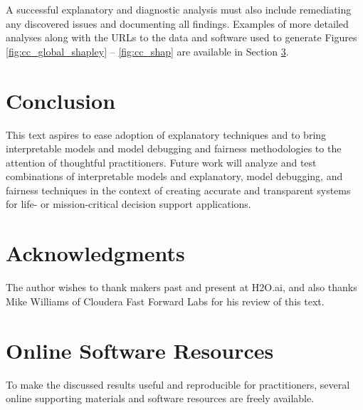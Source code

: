 \documentclass[sigconf, review]{acmart}
\begin{document}
\noindent A successful explanatory and diagnostic analysis must also include remediating any discovered issues and documenting all findings. Examples of more detailed analyses along with the URLs to the data and software used to generate Figures \ref{fig:cc_global_shapley} -- \ref{fig:cc_shap} are available in Section \ref{sec:software}.


\section{Conclusion}

This text aspires to ease adoption of explanatory techniques and to bring interpretable models and model debugging and fairness methodologies to the attention of thoughtful practitioners. Future work will analyze and test combinations of interpretable models and explanatory, model debugging, and fairness techniques in the context of creating accurate and transparent systems for life- or mission-critical decision support applications. 

\section{Acknowledgments}

The author wishes to thank makers past and present at H2O.ai, and also thanks Mike Williams of Cloudera Fast Forward Labs for his review of this text.  




% 
\appendix
\onecolumn
\section{Online Software Resources} \label{sec:software}

To make the discussed results useful and reproducible for practitioners, several online supporting materials and software resources are freely available.\\
\end{document}
